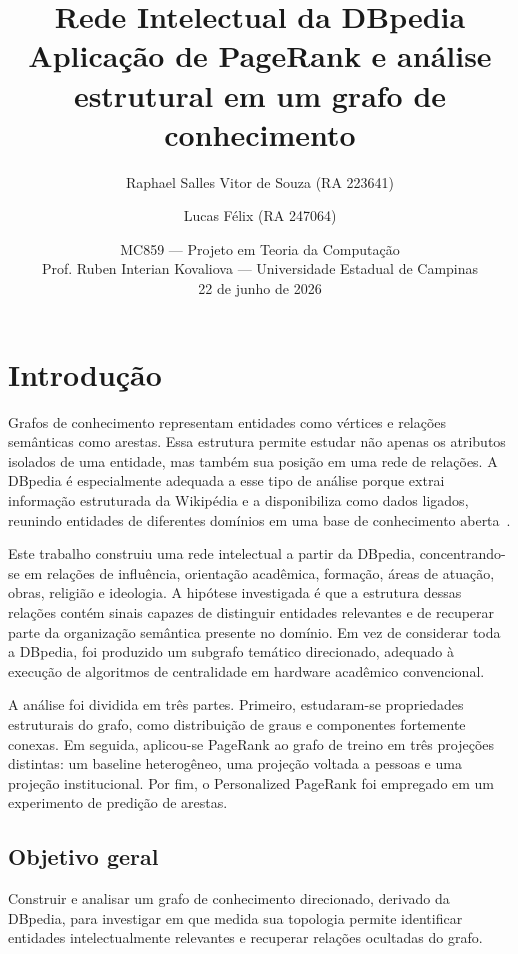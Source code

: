 \documentclass[10pt,a4paper]{article}
\title{\vspace{-1.5cm}\textbf{Rede Intelectual da DBpedia}\\[0.25em]
  \large Aplicação de PageRank e análise estrutural em um grafo de conhecimento}
\author{Raphael Salles Vitor de Souza (RA 223641) \and Lucas Félix (RA 247064)}
\date{MC859 --- Projeto em Teoria da Computação\\
  Prof. Ruben Interian Kovaliova --- Universidade Estadual de Campinas\\
  22 de junho de 2026}
\begin{document}
\maketitle
\vspace{-1.2em}
\begin{center}
\end{center}
\vspace{0.4em}

\section{Introdução}

Grafos de conhecimento representam entidades como vértices e relações semânticas como arestas. Essa estrutura permite estudar não apenas os atributos isolados de uma entidade, mas também sua posição em uma rede de relações. A DBpedia é especialmente adequada a esse tipo de análise porque extrai informação estruturada da Wikipédia e a disponibiliza como dados ligados, reunindo entidades de diferentes domínios em uma base de conhecimento aberta~\cite{dbpedia-about}.

Este trabalho construiu uma rede intelectual a partir da DBpedia, concentrando-se em relações de influência, orientação acadêmica, formação, áreas de atuação, obras, religião e ideologia. A hipótese investigada é que a estrutura dessas relações contém sinais capazes de distinguir entidades relevantes e de recuperar parte da organização semântica presente no domínio. Em vez de considerar toda a DBpedia, foi produzido um subgrafo temático direcionado, adequado à execução de algoritmos de centralidade em hardware acadêmico convencional.

A análise foi dividida em três partes. Primeiro, estudaram-se propriedades estruturais do grafo, como distribuição de graus e componentes fortemente conexas. Em seguida, aplicou-se PageRank ao grafo de treino em três projeções distintas: um baseline heterogêneo, uma projeção voltada a pessoas e uma projeção institucional. Por fim, o Personalized PageRank foi empregado em um experimento de predição de arestas.

\subsection{Objetivo geral}

Construir e analisar um grafo de conhecimento direcionado, derivado da DBpedia, para investigar em que medida sua topologia permite identificar entidades intelectualmente relevantes e recuperar relações ocultadas do grafo.
\end{document}
